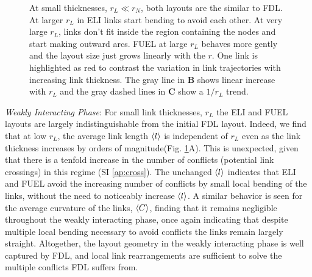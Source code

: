 \documentclass[nofootinbib,preprint,floatfix,titlepage,endfloats,superscriptaddress]{revtex4} %
\begin{document}
\begin{figure}
{         At small thicknesses, $r_L \ll r_N$, both layouts are the similar to FDL. At larger $r_L$ in ELI links start bending to avoid each other. 
         At very large $r_L$, links don't fit inside the region containing the nodes and start making outward arcs. 
         FUEL at large $r_L$ behaves more gently and the layout size just grows linearly with the $r$.
         One link is highlighted as red to contrast the variation in link trajectories with increasing link thickness.
         The gray line in {\bf B} shows linear increase with $r_L$ and the gray dashed lines in {\bf C} show a $1/r_L$ trend. 
          }    
    \label{fig:phase-compare}
\end{figure}

{\em Weakly Interacting Phase}: For small link thicknesses, $r_L$ the ELI and FUEL layouts are largely indistinguishable from the initial FDL layout.
Indeed, we find that at low $r_L$, the average link length $\left<l\right>$ is independent of $r_L$ even as the link thickness increases by orders of magnitude(Fig. \ref{fig:phase-compare}A).
This is unexpected, given that there is a tenfold increase in the number of  conflicts (potential link crossings) in this regime (SI \ref{ap:cross}). %
The unchanged $\left<l\right>$ indicates that ELI and FUEL avoid the increasing number of conflicts by small local bending of the links, without the need to noticeably increase $\left<l\right>$.
A similar behavior is seen for the average curvature of the links, $\left<C\right>$, finding that it remains negligible throughout the weakly interacting phase, once again indicating that despite multiple local bending necessary to avoid conflicts the links remain largely straight. 
Altogether, the layout geometry in the weakly interacting phase is well captured by FDL, and local link rearrangements are sufficient to solve the multiple conflicts FDL suffers from. 
\end{document}

